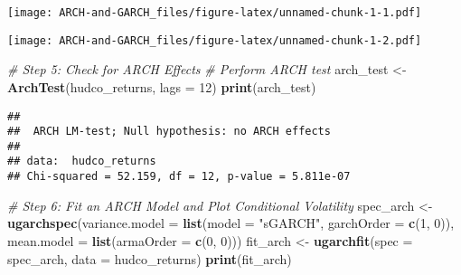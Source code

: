 \documentclass[
]{article}
\newenvironment{Shaded}{\begin{snugshade}}{\end{snugshade}}
\newcommand{\AttributeTok}[1]{\textcolor[rgb]{0.13,0.29,0.53}{#1}}
\newcommand{\CommentTok}[1]{\textcolor[rgb]{0.56,0.35,0.01}{\textit{#1}}}
\newcommand{\DecValTok}[1]{\textcolor[rgb]{0.00,0.00,0.81}{#1}}
\newcommand{\FunctionTok}[1]{\textcolor[rgb]{0.13,0.29,0.53}{\textbf{#1}}}
\newcommand{\NormalTok}[1]{#1}
\newcommand{\OtherTok}[1]{\textcolor[rgb]{0.56,0.35,0.01}{#1}}
\newcommand{\SpecialCharTok}[1]{\textcolor[rgb]{0.81,0.36,0.00}{\textbf{#1}}}
\newcommand{\StringTok}[1]{\textcolor[rgb]{0.31,0.60,0.02}{#1}}
\begin{document}
\texttt{[image: ARCH-and-GARCH\_files/figure-latex/unnamed-chunk-1-1.pdf]}

\begin{Shaded}
\end{Shaded}

\texttt{[image: ARCH-and-GARCH\_files/figure-latex/unnamed-chunk-1-2.pdf]}

\begin{Shaded}
\begin{Highlighting}[]
\CommentTok{\# Step 5: Check for ARCH Effects}
\CommentTok{\# Perform ARCH test}
\NormalTok{arch\_test }\OtherTok{\textless{}{-}} \FunctionTok{ArchTest}\NormalTok{(hudco\_returns, }\AttributeTok{lags =} \DecValTok{12}\NormalTok{)}
\FunctionTok{print}\NormalTok{(arch\_test)}
\end{Highlighting}
\end{Shaded}

\begin{verbatim}
## 
##  ARCH LM-test; Null hypothesis: no ARCH effects
## 
## data:  hudco_returns
## Chi-squared = 52.159, df = 12, p-value = 5.811e-07
\end{verbatim}

\begin{Shaded}
\begin{Highlighting}[]
\CommentTok{\# Step 6: Fit an ARCH Model and Plot Conditional Volatility}
\NormalTok{spec\_arch }\OtherTok{\textless{}{-}} \FunctionTok{ugarchspec}\NormalTok{(}\AttributeTok{variance.model =} \FunctionTok{list}\NormalTok{(}\AttributeTok{model =} \StringTok{"sGARCH"}\NormalTok{, }\AttributeTok{garchOrder =} \FunctionTok{c}\NormalTok{(}\DecValTok{1}\NormalTok{, }\DecValTok{0}\NormalTok{)), }\AttributeTok{mean.model =} \FunctionTok{list}\NormalTok{(}\AttributeTok{armaOrder =} \FunctionTok{c}\NormalTok{(}\DecValTok{0}\NormalTok{, }\DecValTok{0}\NormalTok{)))}
\NormalTok{fit\_arch }\OtherTok{\textless{}{-}} \FunctionTok{ugarchfit}\NormalTok{(}\AttributeTok{spec =}\NormalTok{ spec\_arch, }\AttributeTok{data =}\NormalTok{ hudco\_returns)}
\FunctionTok{print}\NormalTok{(fit\_arch)}
\end{Highlighting}
\end{Shaded}
\end{document}
